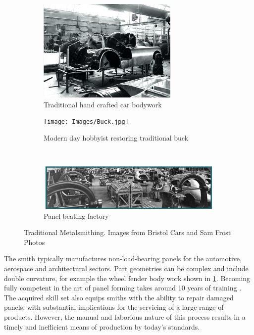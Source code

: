 \begin{figure}[h]
\centering
%
\begin{subfigure}[t]{.45\textwidth}
  \centering
  \includegraphics[height=5cm]{Images/OldCar.png}  
  \caption{Traditional hand crafted car bodywork}
  \label{fig:OldCar}
\end{subfigure}
\begin{subfigure}[t]{.45\textwidth}
  \centering
  \texttt{[image: Images/Buck.jpg]}  
  \caption{Modern day hobbyist restoring traditional buck}
  \label{fig:NewBuck}
\end{subfigure}\\[1ex]
%
\begin{subfigure}{.9\textwidth}
  \centering
  \includegraphics[width=\linewidth]{Images/OldFactory.png}  
  \caption{Panel beating factory}
  \label{fig:OldFactory}
\end{subfigure}
%
\caption{Traditional Metalsmithing. Images from Bristol Cars and Sam Frost Photos}
\label{fig:Background}
\end{figure}

The smith typically manufactures non-load-bearing panels for the automotive, aerospace and architectural sectors. Part geometries can be complex and include double curvature, for example the wheel fender body work shown in \ref{fig:OldCar}. Becoming fully competent in the art of panel forming takes around 10 years of training \citep{Goodwin2020BehindBeaters}. The acquired skill set also equips smiths with the ability to repair damaged panels, with substantial implications for the servicing of a large range of products. However, the manual and laborious nature of this process results in a timely and inefficient means of production by today's standards.

